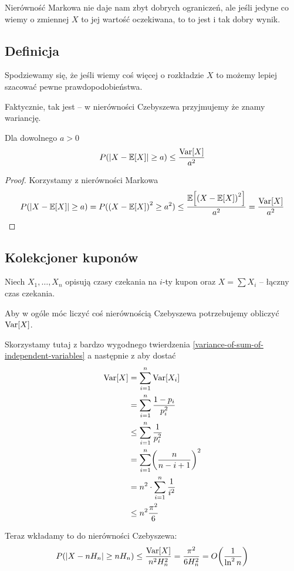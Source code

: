 Nierówność Markowa nie daje nam zbyt dobrych ograniczeń, ale jeśli jedyne co wiemy o zmiennej \( X \) to jej wartość oczekiwana, to to jest i tak dobry wynik.
\subsection{Definicja}
Spodziewamy się, że jeśli wiemy coś więcej o rozkładzie \( X \) to możemy lepiej szacować pewne prawdopodobieństwa.

Faktycznie, tak jest -- w nierówności Czebyszewa przyjmujemy że znamy wariancję.

\begin{theorem}[Twierdzenie 3.6 P\&C]
	Dla dowolnego \( a > 0 \)
	\[
		P(\abs{X - \expected{X}} \geq a) \leq \frac{\variance{X}}{a^2}
	\]
\end{theorem}
\begin{proof}
	Korzystamy z nierówności Markowa
	\[
		P(\abs{X - \expected{X}} \geq a) = P(\pars{X - \expected{X}}^2 \geq a^2)
		\leq \frac{\expected{\pars{X - \expected{X}}^2}}{a^2} = \frac{\variance{X}}{a^2}
	\]
\end{proof}

\subsection{Kolekcjoner kuponów}
Niech \( X_1, \dots, X_n \) opisują czasy czekania na \( i \)-ty kupon oraz \( X = \sum X_i \) -- łączny czas czekania.

Aby w ogóle móc liczyć coś nierównością Czebyszewa potrzebujemy obliczyć \( \variance{X} \).

Skorzystamy tutaj z bardzo wygodnego twierdzenia \ref{variance-of-sum-of-independent-variables}
a następnie z aby dostać
\begin{align*}
	\variance{X}
	 & = \sum_{i=1}^n \variance{X_i}          \\
	 & = \sum_{i=1}^n \frac{1 - p_i}{p_i^2}   \\
	 & \leq \sum_{i=1}^n \frac{1}{p_i^2}      \\
	 & =\sum_{i=1}^n \pars{\frac{n}{n-i+1}}^2 \\
	 & =n^2 \cdot \sum_{i=1}^n \frac{1}{i^2}  \\
	 & \leq n^2\frac{\pi^2}{6}
\end{align*}

Teraz wkładamy to do nierówności Czebyszewa:
\[
	P(\abs{X - nH_n} \geq nH_n) \leq \frac{\variance{X}}{n^2H_n^2} = \frac{\pi^2}{6H_n^2} = O\pars{\frac{1}{\ln^2 n}}
\]
